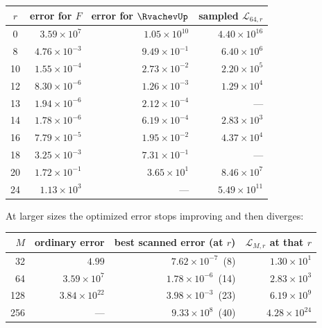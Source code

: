 \documentclass[11pt,oneside]{article}
\numberwithin{equation}{section}
\theoremstyle{definition}
\theoremstyle{remark}
\newcommand{\Leb}{\mathscr L}
\begin{document}
\begin{center}
\small
\begin{tabular}{@{}crrr@{}}
\toprule
$r$ & error for $F$ & error for $\RvachevUp$ & sampled $\Leb_{64,r}$ \\
\midrule
0  & $3.59\times10^{7}$  & $1.05\times10^{10}$ & $4.40\times10^{16}$ \\
8  & $4.76\times10^{-3}$ & $9.49\times10^{-1}$ & $6.40\times10^{6}$ \\
10 & $1.55\times10^{-4}$ & $2.73\times10^{-2}$ & $2.20\times10^{5}$ \\
12 & $8.30\times10^{-6}$ & $1.26\times10^{-3}$ & $1.29\times10^{4}$ \\
13 & $1.94\times10^{-6}$ & $2.12\times10^{-4}$ & --- \\
14 & $1.78\times10^{-6}$ & $6.19\times10^{-4}$ & $2.83\times10^{3}$ \\
16 & $7.79\times10^{-5}$ & $1.95\times10^{-2}$ & $4.37\times10^{4}$ \\
18 & $3.25\times10^{-3}$ & $7.31\times10^{-1}$ & --- \\
20 & $1.72\times10^{-1}$ & $3.65\times10^{1}$  & $8.46\times10^{7}$ \\
24 & $1.13\times10^{3}$  & ---                 & $5.49\times10^{11}$ \\
\bottomrule
\end{tabular}
\label{tab:jet64}
\end{center}

At larger sizes the optimized error stops improving and then
diverges:
\begin{center}
\small
\begin{tabular}{rrrr}
\toprule
$M$ & ordinary error & best scanned error (at $r$) & $\Leb_{M,r}$ at that $r$ \\
\midrule
32  & $4.99$               & $7.62\times10^{-7}$\ (8)  & $1.30\times10^{1}$ \\
64  & $3.59\times10^{7}$   & $1.78\times10^{-6}$\ (14) & $2.83\times10^{3}$ \\
128 & $3.84\times10^{22}$  & $3.98\times10^{-3}$\ (23) & $6.19\times10^{9}$ \\
256 & ---                  & $9.33\times10^{8}$\ (40)  & $4.28\times10^{24}$ \\
\bottomrule
\end{tabular}
\label{tab:optimized}
\end{center}
\end{document}
